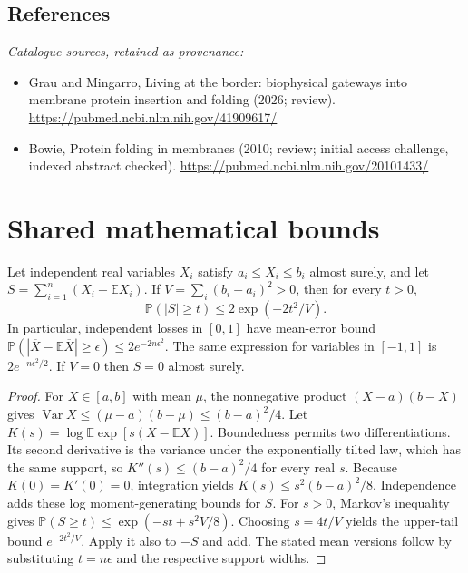\documentclass[11pt]{article}
\begin{document}
\subsection{References}
\noindent\emph{Catalogue sources, retained as provenance:}
\begin{itemize}
\item Grau and Mingarro, Living at the border: biophysical gateways into membrane protein insertion and folding (2026; review). \url{https://pubmed.ncbi.nlm.nih.gov/41909617/}
\item Bowie, Protein folding in membranes (2010; review; initial access challenge, indexed abstract checked). \url{https://pubmed.ncbi.nlm.nih.gov/20101433/}
\end{itemize}




\section{Shared mathematical bounds}\label{app:bounds}
\begin{lemma}\label{lem:bounded}
Let independent real variables $X_i$ satisfy $a_i\leq X_i\leq b_i$ almost surely,
and let $S=\sum_{i=1}^n(X_i-\mathbb{E} X_i)$. If
$V=\sum_i(b_i-a_i)^2>0$, then for every $t>0$,
\[
 \mathbb{P}(|S|\geq t)\leq 2\exp(-2t^2/V).
\]
In particular, independent losses in $[0,1]$ have mean-error bound
$\mathbb{P}(|\overline X-\mathbb{E}\overline X|\geq\epsilon)
\leq2e^{-2n\epsilon^2}$. The same expression for variables in $[-1,1]$
is $2e^{-n\epsilon^2/2}$. If $V=0$ then $S=0$ almost surely.
\end{lemma}
\begin{proof}
For $X\in[a,b]$ with mean $\mu$, the nonnegative product
$(X-a)(b-X)$ gives
$\operatorname{Var} X\leq(\mu-a)(b-\mu)\leq(b-a)^2/4$.
Let $K(s)=\log\mathbb{E}\exp[s(X-\mathbb{E} X)]$.
Boundedness permits two differentiations. Its second derivative is the variance
under the exponentially tilted law, which has the same support, so
$K''(s)\leq(b-a)^2/4$ for every real $s$.
Because $K(0)=K'(0)=0$, integration yields
$K(s)\leq s^2(b-a)^2/8$.
Independence adds these log moment-generating bounds for $S$.
For $s>0$, Markov's inequality gives
$\mathbb{P}(S\geq t)\leq\exp(-st+s^2V/8)$.
Choosing $s=4t/V$ yields the upper-tail bound $e^{-2t^2/V}$.
Apply it also to $-S$ and add. The stated mean versions follow by substituting
$t=n\epsilon$ and the respective support widths.
\end{proof}
\end{document}

